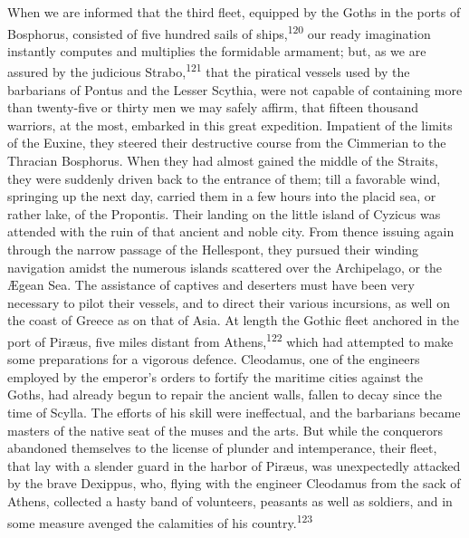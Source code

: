
When we are informed that the third fleet, equipped by the Goths
in the ports of Bosphorus, consisted of five hundred sails of
ships,\textsuperscript{120} our ready imagination instantly computes and
multiplies the formidable armament; but, as we are assured by the
judicious Strabo,\textsuperscript{121} that the piratical vessels used by the
barbarians of Pontus and the Lesser Scythia, were not capable of
containing more than twenty-five or thirty men we may safely
affirm, that fifteen thousand warriors, at the most, embarked in
this great expedition. Impatient of the limits of the Euxine,
they steered their destructive course from the Cimmerian to the
Thracian Bosphorus. When they had almost gained the middle of the
Straits, they were suddenly driven back to the entrance of them;
till a favorable wind, springing up the next day, carried them in
a few hours into the placid sea, or rather lake, of the
Propontis. Their landing on the little island of Cyzicus was
attended with the ruin of that ancient and noble city. From
thence issuing again through the narrow passage of the
Hellespont, they pursued their winding navigation amidst the
numerous islands scattered over the Archipelago, or the Ægean
Sea. The assistance of captives and deserters must have been very
necessary to pilot their vessels, and to direct their various
incursions, as well on the coast of Greece as on that of Asia. At
length the Gothic fleet anchored in the port of Piræus, five
miles distant from Athens,\textsuperscript{122} which had attempted to make some
preparations for a vigorous defence. Cleodamus, one of the
engineers employed by the emperor’s orders to fortify the
maritime cities against the Goths, had already begun to repair
the ancient walls, fallen to decay since the time of Scylla. The
efforts of his skill were ineffectual, and the barbarians became
masters of the native seat of the muses and the arts. But while
the conquerors abandoned themselves to the license of plunder and
intemperance, their fleet, that lay with a slender guard in the
harbor of Piræus, was unexpectedly attacked by the brave
Dexippus, who, flying with the engineer Cleodamus from the sack
of Athens, collected a hasty band of volunteers, peasants as well
as soldiers, and in some measure avenged the calamities of his
country.\textsuperscript{123}


